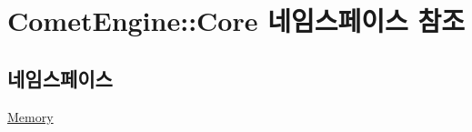 \hypertarget{namespace_comet_engine_1_1_core}{}\section{Comet\+Engine\+:\+:Core 네임스페이스 참조}
\label{namespace_comet_engine_1_1_core}
\subsection*{네임스페이스}
\begin{DoxyCompactItemize}
\item 
 \hyperlink{namespace_comet_engine_1_1_core_1_1_memory}{Memory}
\end{DoxyCompactItemize}
